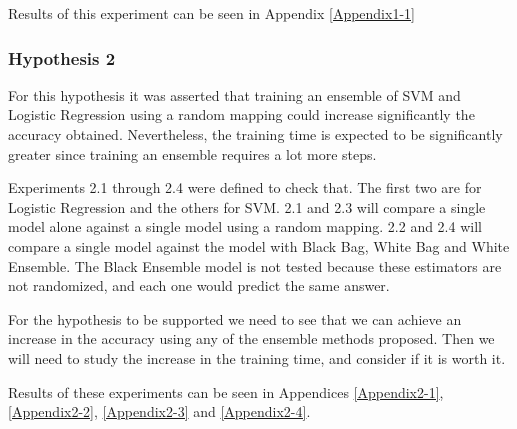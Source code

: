 \begin{pre-delivery}
  Results of this experiment can be seen in Appendix \ref{Appendix1-1}


  \subsubsection*{Hypothesis 2}

  For this hypothesis it was asserted that training an ensemble of SVM and
  Logistic Regression using a random mapping could increase significantly the
  accuracy obtained. Nevertheless, the training time is expected to be
  significantly greater since training an ensemble requires a lot more steps.

  Experiments 2.1 through 2.4 were defined to check that. The first two are for
  Logistic Regression and the others for SVM.
  2.1 and 2.3 will compare a single model alone against a single model using
  a random mapping. 2.2 and 2.4 will compare a single model against the model
  with Black Bag, White Bag and White Ensemble. The Black Ensemble model is not
  tested because these estimators are not randomized, and each one would predict
  the same answer.

  For the hypothesis to be supported we need to see that we can achieve an
  increase in the accuracy using any of the ensemble methods proposed. Then we
  will need to study the increase in the training time, and consider if it
  is worth it.

  Results of these experiments can be seen in Appendices
  \ref{Appendix2-1},
  \ref{Appendix2-2},
  \ref{Appendix2-3} and
  \ref{Appendix2-4}.
  \end{pre-delivery}


